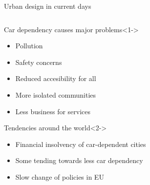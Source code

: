 \documentclass[english, aspectratio=169]{beamer}
\begin{document}
\begin{frame}[t]{Urban design in current days}
\begin{columns}
\begin{column}[t]{0.6\textwidth}

\begin{block}{Car dependency causes major problems}<1->
\begin{itemize}
	\item Pollution
	\item Safety concerns
	\item Reduced accesibility for all 
	\item More isolated communities
	\item Less business for services
\end{itemize}
\end{block}

\begin{block}{Tendencies around the world}<2->
\begin{itemize}
	\item Financial insolvency of car-dependent cities
	\item Some tending towards less car dependency	
	\item Slow change of policies in EU
\end{itemize}
\end{block}
\end{column}


\end{columns}
\end{frame}
\end{document}
